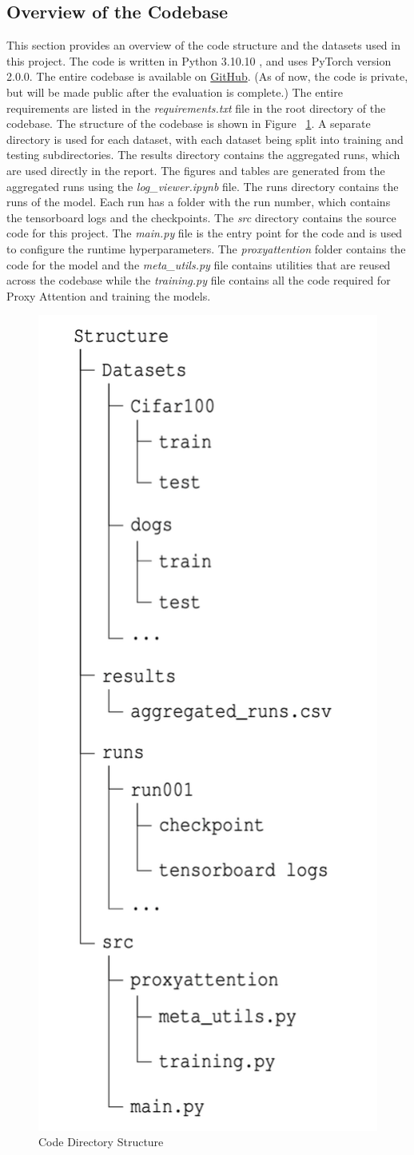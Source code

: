 \documentclass[a4paper,11pt,openright]{book}
\begin{document}
\subsection{Overview of the Codebase}
This section provides an overview of the code structure and the datasets used in this project. The code is written in Python 3.10.10 , and uses PyTorch version 2.0.0. The entire codebase is available on \href{https://github.com/SubhadityaMukherjee/proxy_attention}{GitHub}. (As of now, the code is private, but will be made public after the evaluation is complete.) The entire requirements are listed in the \textit{requirements.txt} file in the root directory of the codebase. The structure of the codebase is shown in Figure ~\ref{fig:overview_code}.
A separate directory is used for each dataset, with each dataset being split into training and testing subdirectories. The results directory contains the aggregated runs, which are used directly in the report. The figures and tables are generated from the aggregated runs using the \textit{log\_viewer.ipynb} file. The runs directory contains the runs of the model. Each run has a folder with the run number, which contains the tensorboard logs and the checkpoints. 
The \textit{src} directory contains the source code for this project. The \textit{main.py} file is the entry point for the code and is used to configure the runtime hyperparameters. The \textit{proxyattention} folder contains the code for the model and the \textit{meta\_utils.py} file contains utilities that are reused across the codebase while the \textit{training.py} file contains all the code required for Proxy Attention and training the models.

\begin{figure}[!htb]
    \centering
    \includegraphics[width=.3\linewidth]{images/dirstruct.png}
    \caption{Code Directory Structure}
    \label{fig:overview_code}
\end{figure}
\end{document}
